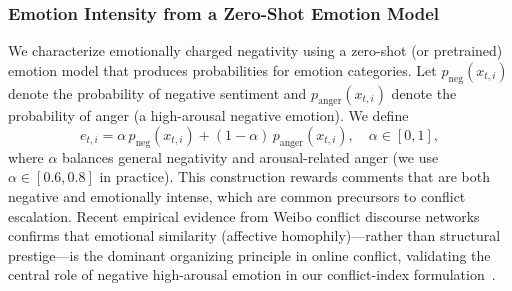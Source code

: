 \documentclass[journal]{IEEEtran}
\begin{document}
\subsubsection{Emotion Intensity from a Zero-Shot Emotion Model}
We characterize emotionally charged negativity using a zero-shot (or pretrained) emotion model that produces probabilities for emotion categories. Let $p_{\text{neg}}(x_{t,i})$ denote the probability of negative sentiment and $p_{\text{anger}}(x_{t,i})$ denote the probability of anger (a high-arousal negative emotion). We define
\begin{equation}
e_{t,i} = \alpha\, p_{\text{neg}}(x_{t,i}) + (1-\alpha)\, p_{\text{anger}}(x_{t,i}), \quad \alpha \in [0,1],
\label{eq:emotion_score}
\end{equation}
where $\alpha$ balances general negativity and arousal-related anger (we use $\alpha\in[0.6,0.8]$ in practice). This construction rewards comments that are both negative and emotionally intense, which are common precursors to conflict escalation. Recent empirical evidence from Weibo conflict discourse networks confirms that emotional similarity (affective homophily)---rather than structural prestige---is the dominant organizing principle in online conflict, validating the central role of negative high-arousal emotion in our conflict-index formulation~\cite{gu2025affective}.
\end{document}
